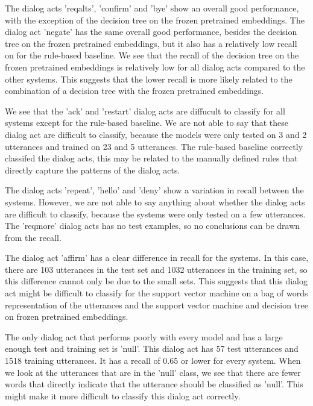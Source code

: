 \documentclass{midl} %
\begin{document}
The dialog acts 'reqalts', 'confirm' and 'bye' show an overall good performance, with the exception of the 
decision tree on the frozen pretrained embeddings. The dialog act 'negate' has the same overall good performance, besides the decision tree on the frozen pretrained embeddings, but it also 
has a relatively low recall on for the rule-based baseline. We see that the recall of the
decision tree on the frozen pretrained embeddings is relatively low for all dialog acts compared to the other systems.
This suggests that the lower recall is more likely related to the combination of 
a decision tree with the frozen pretrained embeddings.\newline

We see that the 'ack' and 'restart' dialog acts are diffucult to classify for all systems except for the rule-based baseline.
We are not able to say that these dialog act are difficult to classify, because the models were only tested on 3 and 2 utterances and 
trained on 23 and 5 utterances.
The rule-based baseline correctly classifed the dialog acts, this may be related to the manually defined rules
that directly capture the patterns of the dialog acts.\newline

The dialog acts 'repeat', 'hello' and 'deny' show a variation in recall between the systems.
However, we are not able to say anything about whether the dialog acts are difficult to classify, because the systems
were only tested on a few utterances. 
The 'reqmore' dialog acts has no test examples, so no conclusions can be drawn from the recall. \newline

The dialog act 'affirm' has a clear difference in recall for the systems. In this case, there are 103 utterances in the test set 
and 1032 utterances in the training set, so this difference cannot only be due to the small sets. 
This suggests that this dialog act might be difficult to classify for the support vector machine 
on a bag of words representation of the utterances and the support vector machine and decision tree on frozen pretrained embeddings.\newline

The only dialog act that performs poorly with every model and has a large enough test and training set is 'null'.
This dialog act has 57 test utterances and 1518 training utterances. It has a recall of 0.65 or lower for every system.
When we look at the utterances that are in the 'null' class, we see that there are fewer words that directly indicate that the utterance should be classified as 'null'.
This might make it more difficult to classify this dialog act correctly.\newline
\end{document}

